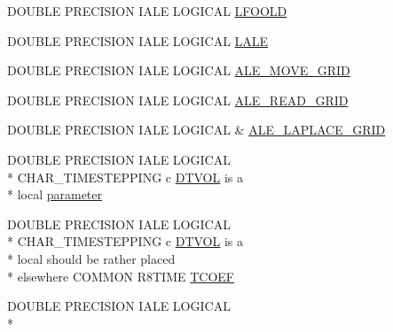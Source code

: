 \begin{DoxyCompactItemize}
\item 
D\-O\-U\-B\-L\-E P\-R\-E\-C\-I\-S\-I\-O\-N I\-A\-L\-E L\-O\-G\-I\-C\-A\-L \hyperlink{home_2abonfi_2_c_f_d__codes_2_eul_f_s_83_84_2include_2time_8com_aa3caaf26a60b8f63f3cf16a7259ac577}{L\-F\-O\-O\-L\-D}
\item 
D\-O\-U\-B\-L\-E P\-R\-E\-C\-I\-S\-I\-O\-N I\-A\-L\-E L\-O\-G\-I\-C\-A\-L \hyperlink{home_2abonfi_2_c_f_d__codes_2_eul_f_s_83_84_2include_2time_8com_a7b2039f5a68429230dbec93e19612196}{L\-A\-L\-E}
\item 
D\-O\-U\-B\-L\-E P\-R\-E\-C\-I\-S\-I\-O\-N I\-A\-L\-E L\-O\-G\-I\-C\-A\-L \hyperlink{home_2abonfi_2_c_f_d__codes_2_eul_f_s_83_84_2include_2time_8com_a6d81a496dd765e23084761363c7b1865}{A\-L\-E\-\_\-\-M\-O\-V\-E\-\_\-\-G\-R\-I\-D}
\item 
D\-O\-U\-B\-L\-E P\-R\-E\-C\-I\-S\-I\-O\-N I\-A\-L\-E L\-O\-G\-I\-C\-A\-L \hyperlink{home_2abonfi_2_c_f_d__codes_2_eul_f_s_83_84_2include_2time_8com_ab585209d677a197e96d5def290cf6a5c}{A\-L\-E\-\_\-\-R\-E\-A\-D\-\_\-\-G\-R\-I\-D}
\item 
D\-O\-U\-B\-L\-E P\-R\-E\-C\-I\-S\-I\-O\-N I\-A\-L\-E L\-O\-G\-I\-C\-A\-L \& \hyperlink{home_2abonfi_2_c_f_d__codes_2_eul_f_s_83_84_2include_2time_8com_ad04368b723f3369a2f62dcea81f2b4f8}{A\-L\-E\-\_\-\-L\-A\-P\-L\-A\-C\-E\-\_\-\-G\-R\-I\-D}
\item 
D\-O\-U\-B\-L\-E P\-R\-E\-C\-I\-S\-I\-O\-N I\-A\-L\-E L\-O\-G\-I\-C\-A\-L \\*
C\-H\-A\-R\-\_\-\-T\-I\-M\-E\-S\-T\-E\-P\-P\-I\-N\-G c \hyperlink{msa20_2home_2abonfi_2_c_f_d__codes_2_eul_f_s_83_82_83_2include_2time_8com_a00486054a38d678ac27310774f9c3d36}{D\-T\-V\-O\-L} is a \\*
local \hyperlink{home_2abonfi_2_c_f_d__codes_2_eul_f_s_83_84_2include_2time_8com_af6b21c8db5d86244135ffb1ede1e0268}{parameter}
\item 
D\-O\-U\-B\-L\-E P\-R\-E\-C\-I\-S\-I\-O\-N I\-A\-L\-E L\-O\-G\-I\-C\-A\-L \\*
C\-H\-A\-R\-\_\-\-T\-I\-M\-E\-S\-T\-E\-P\-P\-I\-N\-G c \hyperlink{msa20_2home_2abonfi_2_c_f_d__codes_2_eul_f_s_83_82_83_2include_2time_8com_a00486054a38d678ac27310774f9c3d36}{D\-T\-V\-O\-L} is a \\*
local should be rather placed \\*
elsewhere C\-O\-M\-M\-O\-N R8\-T\-I\-M\-E \hyperlink{home_2abonfi_2_c_f_d__codes_2_eul_f_s_83_84_2include_2time_8com_a0204718bb6cd176df992cb3acbff1306}{T\-C\-O\-E\-F}
\item 
D\-O\-U\-B\-L\-E P\-R\-E\-C\-I\-S\-I\-O\-N I\-A\-L\-E L\-O\-G\-I\-C\-A\-L \\*

\end{DoxyCompactItemize}
